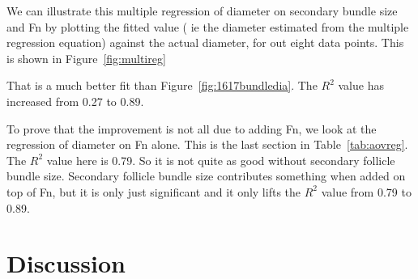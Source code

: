 \documentclass[titlepage]{article}  %
\begin{document}
We can illustrate this multiple regression of diameter on secondary bundle size and Fn by plotting the fitted value ( ie the diameter estimated from the multiple regression equation) against the actual diameter, for out eight data points. This is shown in Figure~\ref{fig:multireg}

That is a much better fit than Figure~\ref{fig:1617bundledia}. The $R^{2}$ value has increased from 0.27 to 0.89.

To prove that the improvement is not all due to adding Fn, we look at the regression of diameter on Fn alone. This is the last section in Table~\ref{tab:aovreg}. The $R^{2}$ value here is 0.79. So it is not quite as good without secondary follicle bundle size. Secondary follicle bundle size contributes something when added on top of Fn, but it is only just significant and it only lifts the $R^{2}$ value from 0.79 to 0.89.

\clearpage
\section{Discussion}

\clearpage
\end{document}
